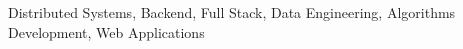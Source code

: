 \documentclass[letter,11pt]{article}
\begin{document}

  Distributed Systems, Backend, Full Stack, Data Engineering, Algorithms Development, Web Applications
\end{document}
